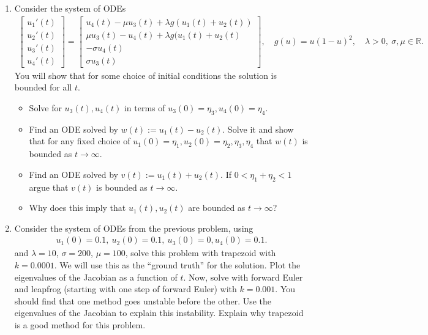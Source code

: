 \documentclass[10pt]{amsart}
\begin{document}
\begin{enumerate}[label={\bf Problem~{\arabic*}:}]
\item Consider the system of ODEs
  \begin{align*}
      \begin{bmatrix} u_1'(t) \\ u_2'(t) \\ u_3'(t) \\ u_4'(t) \end{bmatrix} = \begin{bmatrix} u_4(t) - \mu u_3(t) + \lambda g(u_1(t) + u_2(t))\\
        \mu u_3(t) - u_4(t) +  \lambda g(u_1(t) + u_2(t)\\
        - \sigma u_4(t) \\
      \sigma  u_3(t) \end{bmatrix}, \quad g(u) = u (1-u)^2, \quad \lambda > 0, ~ \sigma, \mu \in \mathbb R.
  \end{align*}
  You will show that for some choice of initial conditions the solution is bounded for all $t$.
  \begin{itemize}
  \item Solve for $u_3(t),u_4(t)$ in terms of $u_3(0) = \eta_3,u _4(0) = \eta_4$.
  \item Find an ODE solved by $w(t) := u_1(t) - u_2(t)$.  Solve it and show that for any fixed choice of $u_1(0) = \eta_1,u_2(0) = \eta_2,\eta_3,\eta_4$ that  $w(t)$ is bounded as $t \to \infty$.
  \item Find an ODE solved by $v(t) := u_1(t) + u_2(t)$.  If $0 < \eta_1 + \eta_2 < 1$ argue that $v(t)$ is bounded as $t \to \infty$.
  \item Why does this imply that $u_1(t), u_2(t)$ are bounded as $t \to \infty$?
  \end{itemize}

  \mline
\item Consider the system of ODEs from the previous problem, using
  \begin{align*}
    u_1(0) = 0.1, ~u_2(0) = 0.1, ~u_3(0) = 0, u_4(0) = 0.1.
  \end{align*}
  and $\lambda = 10$, $\sigma = 200$, $\mu = 100$, solve this problem with trapezoid with $k = 0.0001$.  We will use this as the ``ground truth'' for the solution. Plot the eigenvalues of the Jacobian as a function of $t$.  Now, solve with forward Euler and leapfrog (starting with one step of forward Euler) with $k = 0.001$.  You should find that one method goes unstable before the other.   Use the eigenvalues of the Jacobian to explain this instability. Explain why trapezoid is a good method for this problem.\\
  

\end{enumerate}
\end{document}
